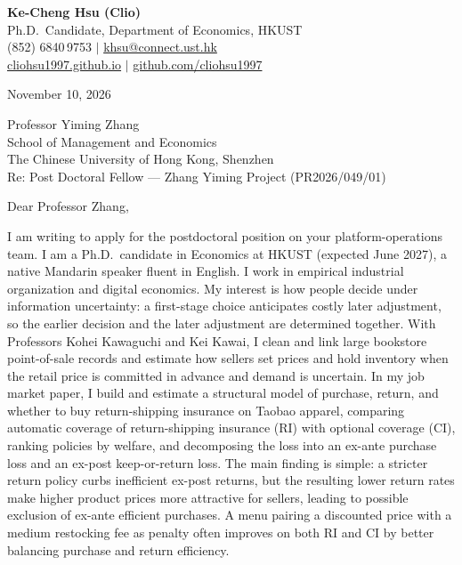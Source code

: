 \documentclass[11pt,letterpaper]{article}
\begin{document}
\noindent
{\bfseries Ke-Cheng Hsu (Clio)}\\
Ph.D.\ Candidate, Department of Economics, HKUST\\
(852) 6840\,9753 \quad $|$ \quad \href{mailto:khsu@connect.ust.hk}{khsu@connect.ust.hk}\\
\href{https://cliohsu1997.github.io/}{cliohsu1997.github.io} \quad $|$ \quad \href{https://github.com/cliohsu1997}{github.com/cliohsu1997}

\vspace{0.3em}
\noindent
November 10, 2026

\vspace{0.15em}
\noindent
Professor Yiming Zhang\\
School of Management and Economics\\
The Chinese University of Hong Kong, Shenzhen\\
Re: Post Doctoral Fellow --- Zhang Yiming Project (PR2026/049/01)

\vspace{0.1em}
Dear Professor Zhang,

I am writing to apply for the postdoctoral position on your platform-operations team. I am a Ph.D.\ candidate in Economics at HKUST (expected June 2027), a native Mandarin speaker fluent in English. I work in empirical industrial organization and digital economics. My interest is how people decide under information uncertainty: a first-stage choice anticipates costly later adjustment, so the earlier decision and the later adjustment are determined together. With Professors Kohei Kawaguchi and Kei Kawai, I clean and link large bookstore point-of-sale records and estimate how sellers set prices and hold inventory when the retail price is committed in advance and demand is uncertain. In my job market paper, I build and estimate a structural model of purchase, return, and whether to buy return-shipping insurance on Taobao apparel, comparing automatic coverage of return-shipping insurance (RI) with optional coverage (CI), ranking policies by welfare, and decomposing the loss into an ex-ante purchase loss and an ex-post keep-or-return loss. The main finding is simple: a stricter return policy curbs inefficient ex-post returns, but the resulting lower return rates make higher product prices more attractive for sellers, leading to possible exclusion of ex-ante efficient purchases. A menu pairing a discounted price with a medium restocking fee as penalty often improves on both RI and CI by better balancing purchase and return efficiency.
\end{document}
